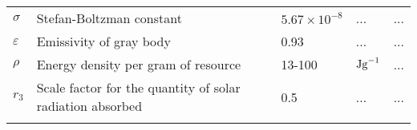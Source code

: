 \begin{sidewaystable}
\begin{tabular}{l l l l l}
$\sigma$ & Stefan-Boltzman constant & $5.67 \times 10^{-8}$ & ... & ...\\
$\varepsilon$& Emissivity of gray body & 0.93& ...& ... \\
$\rho$ &Energy density per gram of resource & 13-100 &  $\rm{J g}^{-1}$  & ... \\  %
$r_3$  & Scale factor for the quantity of solar radiation absorbed & 0.5 & ... & ... \\
\hline
\label{table1}
\end{tabular}
\end{sidewaystable}

